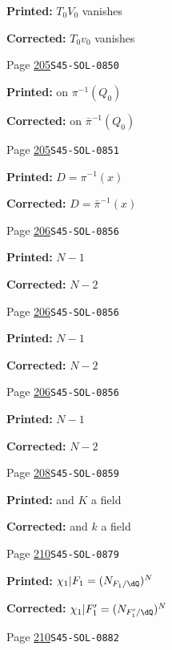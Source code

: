 \begin{description}
\par\noindent\textbf{Printed:} $T_0 V_0$ vanishes
\par\noindent\textbf{Corrected:} $T_0 v_0$ vanishes
\smallskip
\item[\hypertarget{apparatus:EN-0146}{146}] Page \hyperlink{printpage:en:205}{205}\quad\texttt{S45-SOL-0850}
\par\noindent\textbf{Printed:} on $\pi^{-1}(Q_0)$
\par\noindent\textbf{Corrected:} on $\bar\pi^{-1}(Q_0)$
\smallskip
\item[\hypertarget{apparatus:EN-0147}{147}] Page \hyperlink{printpage:en:205}{205}\quad\texttt{S45-SOL-0851}
\par\noindent\textbf{Printed:} $D=\pi^{-1}(x)$
\par\noindent\textbf{Corrected:} $D=\bar\pi^{-1}(x)$
\smallskip
\item[\hypertarget{apparatus:EN-0148}{148}] Page \hyperlink{printpage:en:206}{206}\quad\texttt{S45-SOL-0856}
\par\noindent\textbf{Printed:} \(N-1\)
\par\noindent\textbf{Corrected:} \(N-2\)
\smallskip
\item[\hypertarget{apparatus:EN-0149}{149}] Page \hyperlink{printpage:en:206}{206}\quad\texttt{S45-SOL-0856}
\par\noindent\textbf{Printed:} \(N-1\)
\par\noindent\textbf{Corrected:} \(N-2\)
\smallskip
\item[\hypertarget{apparatus:EN-0150}{150}] Page \hyperlink{printpage:en:206}{206}\quad\texttt{S45-SOL-0856}
\par\noindent\textbf{Printed:} \(N-1\)
\par\noindent\textbf{Corrected:} \(N-2\)
\smallskip
\item[\hypertarget{apparatus:EN-0151}{151}] Page \hyperlink{printpage:en:208}{208}\quad\texttt{S45-SOL-0859}
\par\noindent\textbf{Printed:} and $K$ a field
\par\noindent\textbf{Corrected:} and $k$ a field
\smallskip
\item[\hypertarget{apparatus:EN-0152}{152}] Page \hyperlink{printpage:en:210}{210}\quad\texttt{S45-SOL-0879}
\par\noindent\textbf{Printed:} \(\chi_1|F_1=(N_{F_1/\dQ})^N\)
\par\noindent\textbf{Corrected:} \(\chi_1|F_1'=(N_{F_1'/\dQ})^N\)
\smallskip
\item[\hypertarget{apparatus:EN-0153}{153}] Page \hyperlink{printpage:en:210}{210}\quad\texttt{S45-SOL-0882}

\end{description}
